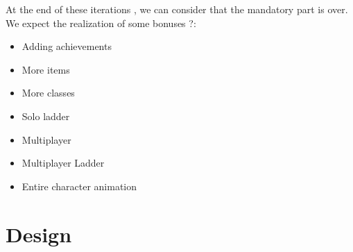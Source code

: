 \documentclass[16pt, oneside]{report}
\begin{document}
At the end of these iterations , we can consider that the mandatory part is over. We expect the realization of some bonuses ?:
\begin{itemize}
\item	Adding achievements
\item	More items
\item	More classes
\item	Solo ladder
\item Multiplayer
\item	 Multiplayer Ladder
\item	Entire character animation
\end{itemize}

\chapter{Design}
\end{document}
